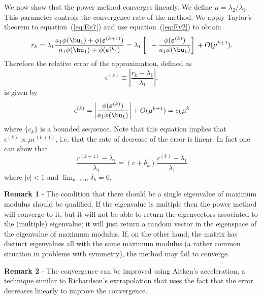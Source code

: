 We now show that the power method converges linearly.  We define $\mu
= {\lambda_2}/{\lambda_1}$.  This parameter controls the convergence
rate of the method.  We apply Taylor's theorem to
equation~(\ref{eq:Ev7}) and use equation~(\ref{eq:Ev2}) to obtain
%
\begin{equation*}
 r_k = \lambda_1 
        \frac{a_1 \phi(\bu_1) + \phi(\boldsymbol{\varepsilon}^{(k+1)})}
             {a_1 \phi(\bu_1) + \phi(\boldsymbol{\varepsilon}^{(k)})} 
     = \lambda_1 
        \left [ 1 - \frac{\phi (\boldsymbol{\varepsilon}^{(k)} )}{a_1 \phi(\bu_1)}\right ] \,
        + O(\mu^{k+1}) .
\end{equation*}
%
Therefore the relative error of the approximation, defined as
%
\begin{equation}
  \epsilon^{(k)} \equiv \left |
    \frac{r_k - \lambda_1}{\lambda_1} \right | ,
  \label{eq:Ev4}
\end{equation}
%
is given by
%
\begin{equation}
  \epsilon^{(k)} = 
  \left | \frac{\phi (\boldsymbol{\varepsilon}^{(k)} )}{a_1 \phi(\bu_1)} \right|  + O(\mu^{k+1}) =  c_k \mu^k 
  \label{eq:Ev9}
\end{equation}
%
where $\{c_k\}$ is a bounded sequence.  Note that this equation
implies that $\epsilon^{(k)} \propto \mu \epsilon^{(k+1)}$, i.e. that
the rate of decrease of the error is linear.  In fact one can show
that
%
\begin{equation*}
  \frac{r^{(k+1)} - \lambda_1}{\lambda_1} = (c + \delta_k) 
  \frac{r^{(k)} - \lambda_1}{\lambda_1} 
\end{equation*}
%
where $|c| < 1$ and $\lim_{k \to \infty} \delta_k = 0$.

\smallskip

\smallskip

\noindent \textbf{Remark 1} - The condition that there should be a
single eigenvalue of maximum modulus should be qualified.  If the
eigenvalue is multiple then the power method will converge to it, but
it will not be able to return the eigenvectors associated to the
(multiple) eigenvalue; it will just return a random vector in the
eigenspace of the eigenvalue of maximum modulus.  If, on the other
hand, the matrix has distinct eigenvalues all with the same maximum
modulus (a rather common situation in problems with symmetry), the
method may fail to converge.

\smallskip 

\noindent \textbf{Remark 2} - The convergence can be improved using
Aitken's acceleration, a technique similar to Richardson's
extrapolation  that uses the fact that the error decreases linearly to
improve the convergence.

